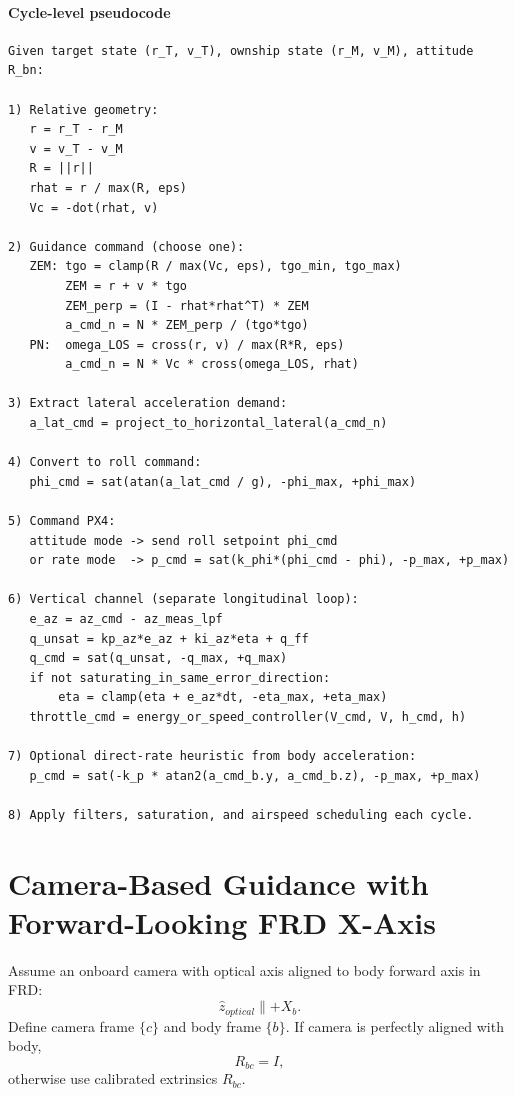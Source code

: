 \documentclass[11pt,a4paper]{article}
\begin{document}
\paragraph{Cycle-level pseudocode}
\begin{verbatim}
Given target state (r_T, v_T), ownship state (r_M, v_M), attitude R_bn:

1) Relative geometry:
   r = r_T - r_M
   v = v_T - v_M
   R = ||r||
   rhat = r / max(R, eps)
   Vc = -dot(rhat, v)

2) Guidance command (choose one):
   ZEM: tgo = clamp(R / max(Vc, eps), tgo_min, tgo_max)
        ZEM = r + v * tgo
        ZEM_perp = (I - rhat*rhat^T) * ZEM
        a_cmd_n = N * ZEM_perp / (tgo*tgo)
   PN:  omega_LOS = cross(r, v) / max(R*R, eps)
        a_cmd_n = N * Vc * cross(omega_LOS, rhat)

3) Extract lateral acceleration demand:
   a_lat_cmd = project_to_horizontal_lateral(a_cmd_n)

4) Convert to roll command:
   phi_cmd = sat(atan(a_lat_cmd / g), -phi_max, +phi_max)

5) Command PX4:
   attitude mode -> send roll setpoint phi_cmd
   or rate mode  -> p_cmd = sat(k_phi*(phi_cmd - phi), -p_max, +p_max)

6) Vertical channel (separate longitudinal loop):
   e_az = az_cmd - az_meas_lpf
   q_unsat = kp_az*e_az + ki_az*eta + q_ff
   q_cmd = sat(q_unsat, -q_max, +q_max)
   if not saturating_in_same_error_direction:
       eta = clamp(eta + e_az*dt, -eta_max, +eta_max)
   throttle_cmd = energy_or_speed_controller(V_cmd, V, h_cmd, h)

7) Optional direct-rate heuristic from body acceleration:
   p_cmd = sat(-k_p * atan2(a_cmd_b.y, a_cmd_b.z), -p_max, +p_max)

8) Apply filters, saturation, and airspeed scheduling each cycle.
\end{verbatim}

\section{Camera-Based Guidance with Forward-Looking FRD X-Axis}
Assume an onboard camera with optical axis aligned to body forward axis in FRD:
\begin{equation}
\hat{z}_{optical} \parallel +X_b.
\end{equation}
Define camera frame $\{c\}$ and body frame $\{b\}$. If camera is perfectly aligned with body,
\begin{equation}
R_{bc}=I,
\end{equation}
otherwise use calibrated extrinsics $R_{bc}$.
\end{document}
